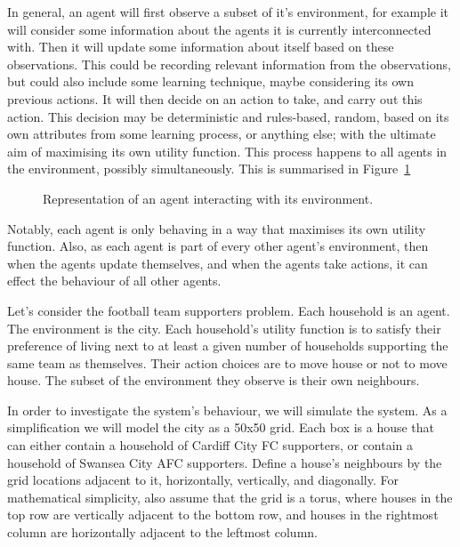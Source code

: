 In general, an agent will first observe a subset of it's environment, for
example it will consider some information about the agents it is currently
interconnected with.
Then it will update some information about itself based on these observations.
This could be recording relevant information from the observations, but could
also include some learning technique, maybe considering its own previous
actions.
It will then decide on an action to take, and carry out this action. This
decision may be deterministic and rules-based, random, based on its own
attributes from some learning process, or anything else; with the ultimate aim of
maximising its own utility function.
This process happens to all agents in the environment, possibly simultaneously.
This is summarised in Figure~\ref{fig:abm_diagram}

\begin{figure}
\begin{center}

\end{center}
\caption{Representation of an agent interacting with its environment.}
\label{fig:abm_diagram}
\end{figure}

Notably, each agent is only behaving in a way that maximises its own utility
function. Also, as each agent is part of every other agent's environment, then
when the agents update themselves, and when the agents take actions, it can
effect the behaviour of all other agents.

Let's consider the football team supporters problem.
Each household is an agent.
The environment is the city.
Each household's utility function is to satisfy their preference of living next
to at least a given number of households supporting the same team as themselves.
Their action choices are to move house or not to move house.
The subset of the environment they observe is their own neighbours.

In order to investigate the system's behaviour, we will simulate the system.
As a simplification we will model the city as a 50x50 grid.
Each box is a house that can either contain a household of Cardiff City FC
supporters, or contain a household of Swansea City AFC supporters.
Define a house's neighbours by the grid locations adjacent to it, horizontally,
vertically, and diagonally.
For mathematical simplicity, also assume that the grid is a torus, where houses
in the top row are vertically adjacent to the bottom row, and houses in the
rightmost column are horizontally adjacent to the leftmost column.

